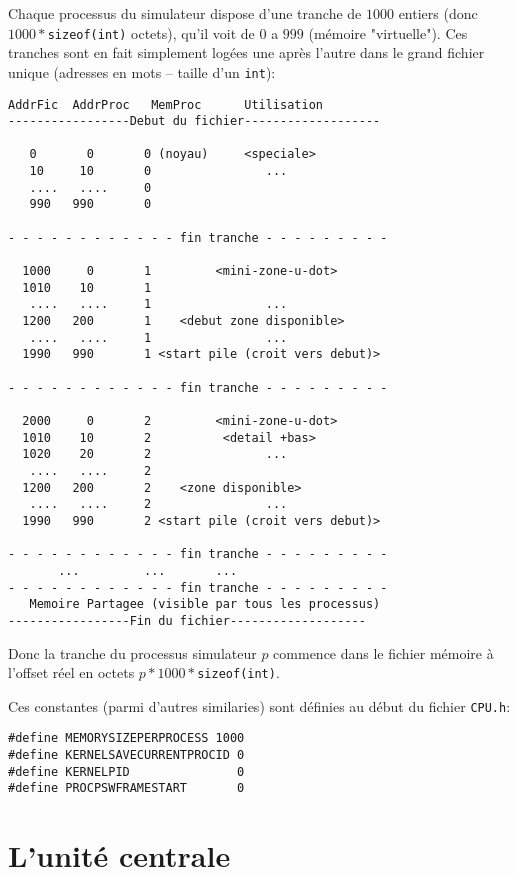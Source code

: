\documentclass{article}
\begin{document}
Chaque processus du simulateur dispose d'une tranche de $1000$ entiers (donc
$1000 *$\texttt{sizeof(int)} octets), qu'il voit de $0$ a $999$ (m\'emoire
"virtuelle"). Ces tranches sont en fait simplement log\'ees une apr\`es
l'autre dans le grand fichier unique (adresses en mots -- taille d'un \texttt{int}):

{\small
\begin{verbatim}
AddrFic  AddrProc   MemProc      Utilisation
-----------------Debut du fichier-------------------

   0       0       0 (noyau)     <speciale>
   10     10       0                ...
   ....   ....     0
   990   990       0 

- - - - - - - - - - - - fin tranche - - - - - - - - -

  1000     0       1         <mini-zone-u-dot>      
  1010    10       1         
   ....   ....     1                ...
  1200   200       1    <debut zone disponible>
   ....   ....     1                ...
  1990   990       1 <start pile (croit vers debut)>

- - - - - - - - - - - - fin tranche - - - - - - - - -

  2000     0       2         <mini-zone-u-dot>      
  1010    10       2          <detail +bas>
  1020    20       2                ...
   ....   ....     2
  1200   200       2    <zone disponible>
   ....   ....     2                ...
  1990   990       2 <start pile (croit vers debut)>

- - - - - - - - - - - - fin tranche - - - - - - - - -
       ...         ...       ...
- - - - - - - - - - - - fin tranche - - - - - - - - -
   Memoire Partagee (visible par tous les processus)
-----------------Fin du fichier-------------------
\end{verbatim}}

Donc la tranche du processus simulateur $p$ commence dans le fichier m\'emoire
\`a l'offset r\'eel en octets $p*1000*$\texttt{sizeof(int)}.

Ces constantes (parmi d'autres similaries) sont d\'efinies au d\'ebut du fichier \texttt{CPU.h}: 

\begin{verbatim}
#define MEMORYSIZEPERPROCESS 1000 
#define KERNELSAVECURRENTPROCID 0
#define KERNELPID               0 
#define PROCPSWFRAMESTART       0
\end{verbatim}

\section{L'unit\'e centrale}
\end{document}
